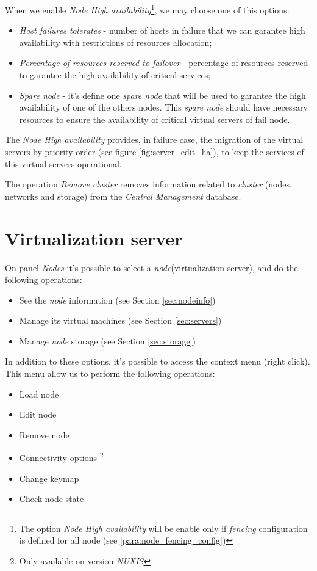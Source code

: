 When we enable \emph{Node High availability}\footnote{The option \emph{Node High availability} will be enable only if \emph{fencing} configuration is defined for all node (see \ref{para:node_fencing_config})}, we may choose one of this options:

\begin{itemize}
    \item \emph{Host failures tolerates} - number of hosts in failure that we can garantee high availability with restrictions of resources allocation;
    \item \emph{Percentage of resources reserved to failover} - percentage of resources reserved to garantee the high availability of critical services;
    \item \emph{Spare node} - it's define one \emph{spare node} that will be used to garantee the high availability of one of the others nodes. This \emph{spare node} should have necessary resources to ensure the availability of critical virtual servers of fail node.
\end{itemize}

The \emph{Node High availability} provides, in failure case, the migration of the virtual servers by priority order (see figure \ref{fig:server_edit_ha}), to keep the services of this virtual servers operational.

The operation \emph{Remove cluster} removes information related to \emph{cluster} (nodes, networks and storage) from the \emph{Central Management} database.


\section{Virtualization server}
\label{sec:node}

On panel \emph{Nodes} it's possible to select a \emph{node}(virtualization server), and do the following operations:
\begin{itemize}
    \item See the \emph{node} information (see Section \ref{sec:nodeinfo})
    \item Manage its virtual machines (see Section \ref{sec:servers})
    \item Manage \emph{node} storage (see Section  \ref{sec:storage})
\end{itemize}

In addition to these options, it's possible to access the context menu (right click). This menu allow us to perform the following operations:
\begin{itemize}
    \item Load node
    \item Edit node
    \item Remove node
    \item Connectivity options \footnote{Only available on version \emph{NUXIS}}
    \item Change keymap
    \item Check node state
\end{itemize}

